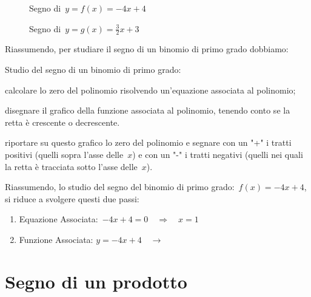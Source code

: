\begin{inaccessibleblock}
 \begin{figure}[h]
 \centering
 \begin{minipage}[]{.45\textwidth}
  \centering{}
  \caption{Segno di~\(y = f(x) = -4 x +4\)}
 \end{minipage}
 \begin{minipage}[]{.45\textwidth}
  \centering{}
  \caption{Segno di~\(y = g(x) = \frac{3}{2} x +3\)}
 \end{minipage}
\end{figure}
\end{inaccessibleblock}

Riassumendo, per studiare il segno di un binomio di primo grado dobbiamo: 

\begin{procedura}
 Studio del segno di un binomio di primo grado:
\begin{enumeratea}
\item calcolare lo zero del polinomio risolvendo un'equazione associata al 
 polinomio;
\item disegnare il grafico della funzione associata al polinomio, 
 tenendo conto se la retta è crescente o decrescente.
\item riportare su questo grafico lo zero del polinomio e segnare con un 
 "+" i tratti positivi (quelli sopra l'asse delle~\(x\)) e con un "-" i 
 tratti  negativi (quelli nei quali la retta è tracciata sotto l'asse 
delle~\(x\)).
\end{enumeratea}
\end{procedura}

Riassumendo, lo studio del segno del binomio di primo 
grado:~\(f(x) = -4 x +4\), si riduce a svolgere questi due passi:

\begin{enumerate}
 \item
  Equazione Associata:~\(-4 x +4 = 0 \quad \Rightarrow \quad x = 1\)
 \item 
  \begin{minipage}{.45\textwidth}
  Funzione Associata: \(y = -4 x +4 \quad \rightarrow\)
  \end{minipage}
  \begin{minipage}{.30\textwidth}
  \end{minipage}
\end{enumerate}

\section{Segno di un prodotto}
\label{sec:dis_prodotto}

